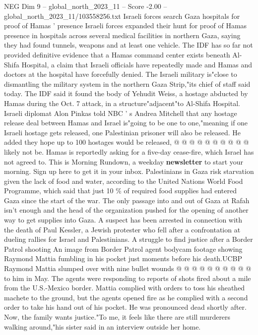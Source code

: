 \begin{textsample}{NEG Dim 9 – global\_north\_2023\_11 – Score -2.00 – global\_north\_2023\_11/103558256.txt}  \label{ex:f9_neg_301}
Israeli forces search Gaza hospitals for proof of Hamas ' presence Israeli forces expanded their hunt for proof of Hamas presence in hospitals across several medical facilities in northern Gaza, saying they had found tunnels, weapons and at least one vehicle.
The IDF has so far not provided definitive evidence that a Hamas command center exists beneath Al-Shifa Hospital, a claim that Israeli officials have repeatedly made and Hamas and doctors at the hospital have forcefully denied.
The Israeli military is"close to dismantling the military system in the northern Gaza Strip,"its chief of staff said today.
The IDF said it found the body of Yehudit Weiss, a hostage abducted by Hamas during the Oct. 7 attack, in a structure"adjacent"to Al-Shifa Hospital.
Israeli diplomat Alon Pinkas told NBC ' s Andrea Mitchell that any hostage release deal between Hamas and Israel is"going to be one to one,"meaning if one Israeli hostage gets released, one Palestinian prisoner will also be released.
He added they hope up to 100 hostages would be released, @ @ @ @ @ @ @ @ @ @ likely not be.
Hamas is reportedly asking for a five-day cease-fire, which Israel has not agreed to.
This is Morning Rundown, a weekday \textbf{newsletter} to start your morning.
Sign up here to get it in your inbox.
Palestinians in Gaza risk starvation given the lack of food and water, according to the United Nations World Food Programme, which said that just 10 \% of required food supplies had entered Gaza since the start of the war.
The only passage into and out of Gaza at Rafah isn't enough and the head of the organization pushed for the opening of another way to get supplies into Gaza.
A suspect has been arrested in connection with the death of Paul Kessler, a Jewish protester who fell after a confrontation at dueling rallies for Israel and Palestinians.
A struggle to find justice after a Border Patrol shooting An image from Border Patrol agent bodycam footage showing Raymond Mattia fumbling in his pocket just moments before his death.UCBP Raymond Mattia slumped over with nine bullet wounds @ @ @ @ @ @ @ @ @ @ to him in May.
The agents were responding to reports of shots fired about a mile from the U.S.-Mexico border.
Mattia complied with orders to toss his sheathed machete to the ground, but the agents opened fire as he complied with a second order to take his hand out of his pocket.
He was pronounced dead shortly after.
Now, the family wants justice."To me, it feels like there are still murderers walking around,"his sister said in an interview outside her home.

\end{textsample}
